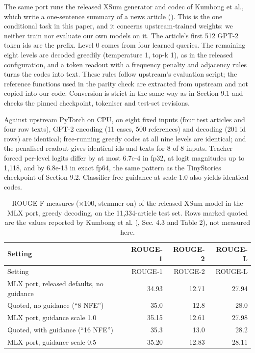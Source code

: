 \documentclass[
  british,
]{article}
\begin{document}
The same port runs the released XSum generator and codec of Kumbong et
al., which write a one-sentence summary of a news article
(). This is the one
conditional task in this paper, and it concerns upstream-trained
weights: we neither train nor evaluate our own models on it. The
article's first 512 GPT-2 token ids are the prefix. Level 0 comes from
four learned queries. The remaining eight levels are decoded greedily
(temperature 1, top-k 1), as in the released configuration, and a token
readout with a frequency penalty and adjacency rules turns the codes
into text. These rules follow upstream's evaluation script; the
reference functions used in the parity check are extracted from upstream
and not copied into our code. Conversion is strict in the same way as in
Section 9.1 and checks the pinned checkpoint, tokeniser and test-set
revisions.

Against upstream PyTorch on CPU, on eight fixed inputs (four test
articles and four raw texts), GPT-2 encoding (11 cases, 500 references)
and decoding (201 id rows) are identical; free-running greedy codes at
all nine levels are identical; and the penalised readout gives identical
ids and texts for 8 of 8 inputs. Teacher-forced per-level logits differ
by at most 6.7e-4 in fp32, at logit magnitudes up to 1,118, and by
6.8e-13 in exact fp64, the same pattern as the TinyStories checkpoint of
Section 9.2. Classifier-free guidance at scale 1.0 also yields identical
codes.

\begin{longtable}[]{@{}lrrr@{}}
\caption{ROUGE F-measures (×100, stemmer on) of the released XSum model
in the MLX port, greedy decoding, on the 11,334-article test set. Rows
marked quoted are the values reported by Kumbong et al.
(, Sec. 4.3 and Table 2), not
measured here.}\tabularnewline
\toprule\noalign{}
Setting & ROUGE-1 & ROUGE-2 & ROUGE-L \\
\midrule\noalign{}
\endfirsthead
\toprule\noalign{}
Setting & ROUGE-1 & ROUGE-2 & ROUGE-L \\
\midrule\noalign{}
\endhead
\bottomrule\noalign{}
\endlastfoot
MLX port, released defaults, no guidance & 34.93 & 12.71 & 27.94 \\
Quoted, no guidance (``8 NFE'') & 35.0 & 12.8 & 28.0 \\
MLX port, guidance scale 1.0 & 35.15 & 12.61 & 27.98 \\
Quoted, with guidance (``16 NFE'') & 35.3 & 13.0 & 28.2 \\
MLX port, guidance scale 0.5 & 35.20 & 12.83 & 28.11 \\
\end{longtable}
\end{document}
